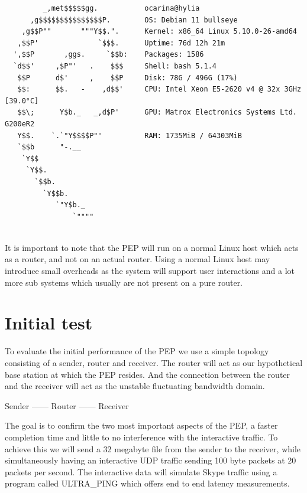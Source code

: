 \documentclass[a4paper,english, 11pt]{report}
\begin{document}
\noindent\begin{minipage}{\linewidth}
\begin{verbatim}
         _,met$$$$$gg.           ocarina@hylia
      ,g$$$$$$$$$$$$$$$P.        OS: Debian 11 bullseye
    ,g$$P""       """Y$$.".      Kernel: x86_64 Linux 5.10.0-26-amd64
   ,$$P'              `$$$.      Uptime: 76d 12h 21m
  ',$$P       ,ggs.     `$$b:    Packages: 1586
  `d$$'     ,$P"'   .    $$$     Shell: bash 5.1.4
   $$P      d$'     ,    $$P     Disk: 78G / 496G (17%)
   $$:      $$.   -    ,d$$'     CPU: Intel Xeon E5-2620 v4 @ 32x 3GHz [39.0°C]
   $$\;      Y$b._   _,d$P'      GPU: Matrox Electronics Systems Ltd. G200eR2
   Y$$.    `.`"Y$$$$P"'          RAM: 1735MiB / 64303MiB
   `$$b      "-.__
    `Y$$
     `Y$$.
       `$$b.
         `Y$$b.
            `"Y$b._
                `""""
\end{verbatim}
\end{minipage}\\

It is important to note that the PEP will run on a normal Linux host which acts as a router, and not on an actual router. Using a normal Linux host may introduce small overheads as the system will support user interactions and a lot more sub systems which usually are not present on a pure router.

\section{Initial test}
To evaluate the initial performance of the PEP we use a simple topology consisting of a sender, router and receiver. The router will act as our hypothetical base station at which the PEP resides. And the connection between the router and the receiver will act as the unstable fluctuating bandwidth domain.

\begin{center}
Sender ------ Router ------ Receiver\\
\end{center}

The goal is to confirm the two most important aspects of the PEP, a faster completion time and little to no interference with the interactive traffic. To achieve this we will send a 32 megabyte file from the sender to the receiver, while simultaneously having an interactive UDP traffic sending 100 byte packets at 20 packets per second. The interactive data will simulate Skype traffic using a program called ULTRA\_PING\cite{rahtz2023ultraping} which offers end to end latency measurements.\\
\end{document}
